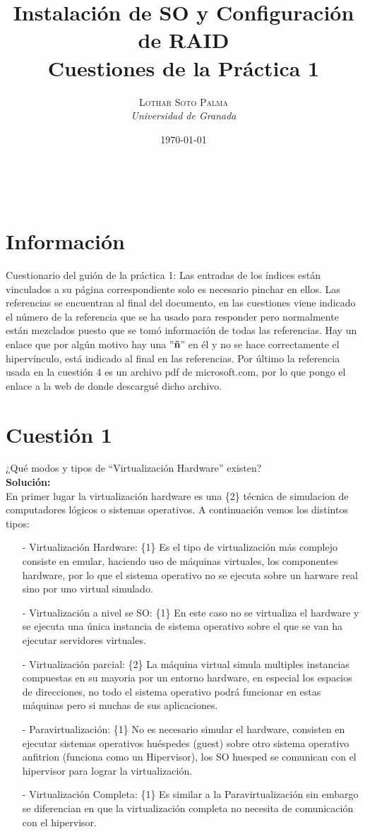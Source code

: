 \documentclass[a4paper, 11pt]{article} %
\title{\textbf{Instalación de SO y Configuración de RAID}\\ %
\vspace{20 pt}
Cuestiones de la Práctica 1} %
\author{\textsc{Lothar Soto Palma} %
\\{\textit{Universidad de Granada}}} %
\date{\today} %
\makeatletter
\renewcommand{\maketitle}{ %
\begin{center} %
{\Huge\@title} %
\end{center}

\vspace{20pt} %

\begin{flushright} %
{\large\@author} %
\\\@date %

\vspace{40pt} %
\end{flushright}
}
\makeatother
\begin{document}
\maketitle
\pagebreak
\tableofcontents
\pagebreak
\listoffigures
\section{Información}
Cuestionario del guión de la práctica 1:
Las entradas de los índices están vinculados a su página correspondiente solo es necesario pinchar en ellos.
Las referencias se encuentran al final del documento, en las cuestiones viene indicado el número de la referencia que se ha usado para responder pero normalmente están mezclados puesto que se tomó información de todas las referencias. Hay un enlace que por algún motivo hay una ''\textbf{ñ}'' en él y no se hace correctamente el hipervínculo, está indicado al final en las referencias. Por último la referencia usada en la cuestión 4 es un archivo pdf de microsoft.com, por lo que pongo el enlace a la web de donde descargué dicho archivo.
\section{Cuestión 1}
¿Qué modos y tipos de “Virtualización Hardware” existen?\\
\textbf{Solución:}\\
En primer lugar la virtualización hardware es una \{2\} técnica de simulacion de computadores lógicos o sistemas operativos. A continuación vemos los distintos tipos:
\begin{itemize}
\item[-]Virtualización Hardware: \{1\} Es el tipo de virtualización más complejo consiste en emular, haciendo uso de máquinas virtuales, los componentes hardware, por lo que el sistema operativo no se ejecuta sobre un harware real sino por uno virtual simulado.
\item[-]Virtualización a nivel se SO: \{1\} En este caso no se virtualiza el hardware y se ejecuta una única instancia de sistema operativo sobre el que se van ha ejecutar servidores virtuales.
\item[-]Virtualización parcial: \{2\} La máquina virtual simula multiples instancias compuestas en su mayoria por un entorno hardware, en especial los espacios de direcciones, no todo el sistema operativo podrá funcionar en estas máquinas pero si muchas de sus aplicaciones.  
\item[-]Paravirtualización: \{1\} No es necesario simular el hardware, consisten en ejecutar sistemas operativos huéspedes (guest) sobre otro sistema operativo anfitrion (funciona como un Hipervisor), los SO huesped se comunican con el hipervisor para lograr la virtualización.
\item[-]Virtualización Completa: \{1\} Es similar a la Paravirtualización sin embargo se diferencian en que la virtualización completa no necesita de comunicación con el hipervisor.
\end{itemize}
\end{document}
